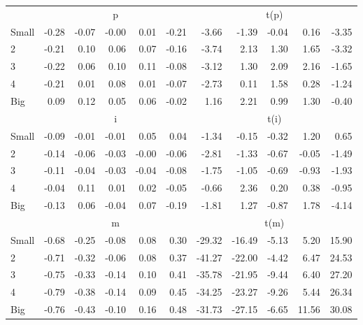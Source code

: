 \begin{tabular}{lrrrrrrrrrr}
  
     & \multicolumn{5}{c}{p} & \multicolumn{5}{c}{t(p)}   \\
     \cmidrule(r){2-6} \cmidrule(r){7-11} 
    Small  & -0.28  & -0.07  & -0.00  & 0.01  & -0.21  & -3.66  & -1.39  & -0.04  & 0.16  & -3.35   \\
    2  & -0.21  & 0.10  & 0.06  & 0.07  & -0.16  & -3.74  & 2.13  & 1.30  & 1.65  & -3.32   \\
    3  & -0.22  & 0.06  & 0.10  & 0.11  & -0.08  & -3.12  & 1.30  & 2.09  & 2.16  & -1.65   \\
    4  & -0.21  & 0.01  & 0.08  & 0.01  & -0.07  & -2.73  & 0.11  & 1.58  & 0.28  & -1.24   \\
    Big  & 0.09  & 0.12  & 0.05  & 0.06  & -0.02  & 1.16  & 2.21  & 0.99  & 1.30  & -0.40   \\
    
  
     & \multicolumn{5}{c}{i} & \multicolumn{5}{c}{t(i)}   \\
     \cmidrule(r){2-6} \cmidrule(r){7-11} 
    Small  & -0.09  & -0.01  & -0.01  & 0.05  & 0.04  & -1.34  & -0.15  & -0.32  & 1.20  & 0.65   \\
    2  & -0.14  & -0.06  & -0.03  & -0.00  & -0.06  & -2.81  & -1.33  & -0.67  & -0.05  & -1.49   \\
    3  & -0.11  & -0.04  & -0.03  & -0.04  & -0.08  & -1.75  & -1.05  & -0.69  & -0.93  & -1.93   \\
    4  & -0.04  & 0.11  & 0.01  & 0.02  & -0.05  & -0.66  & 2.36  & 0.20  & 0.38  & -0.95   \\
    Big  & -0.13  & 0.06  & -0.04  & 0.07  & -0.19  & -1.81  & 1.27  & -0.87  & 1.78  & -4.14   \\
    
  
     & \multicolumn{5}{c}{m} & \multicolumn{5}{c}{t(m)}   \\
     \cmidrule(r){2-6} \cmidrule(r){7-11} 
    Small  & -0.68  & -0.25  & -0.08  & 0.08  & 0.30  & -29.32  & -16.49  & -5.13  & 5.20  & 15.90   \\
    2  & -0.71  & -0.32  & -0.06  & 0.08  & 0.37  & -41.27  & -22.00  & -4.42  & 6.47  & 24.53   \\
    3  & -0.75  & -0.33  & -0.14  & 0.10  & 0.41  & -35.78  & -21.95  & -9.44  & 6.40  & 27.20   \\
    4  & -0.79  & -0.38  & -0.14  & 0.09  & 0.45  & -34.25  & -23.27  & -9.26  & 5.44  & 26.34   \\
    Big  & -0.76  & -0.43  & -0.10  & 0.16  & 0.48  & -31.73  & -27.15  & -6.65  & 11.56  & 30.08   \\
  
  \bottomrule
\end{tabular}

